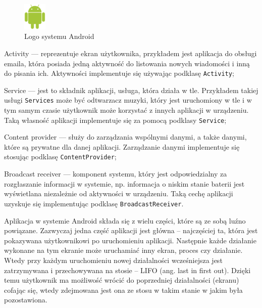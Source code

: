 \documentclass[eng,printmode,oneside]{mgr}
\begin{document}
\vspace{-2mm}
\begin{itemize}
  \item \parbox[t]{\dimexpr\textwidth-\leftmargin}{
     \vspace{-2.5mm}
    \begin{figure}
	\centering
	\includegraphics[width=0.1\textwidth]{andlogo.png}
	\caption{\label{fig:andlogo}Logo systemu Android \cite{developer.android}}
	\end{figure}
  Activity --- reprezentuje ekran użytkownika, przykładem jest aplikacja
  do obsługi emaila, która posiada jedną aktywność do listowania nowych
  wiadomości i inną do pisania ich. Aktywności implementuje się używając
  podklasę \texttt{Activity};
  \item Service --- jest to składnik aplikacji, usługa, która działa w tle.
  Przykładem takiej usługi \texttt{Services} może być odtwarzacz muzyki, który
  jest uruchomiony w tle i w tym samym czasie użytkownik może korzystać z innych aplikacji w urządzeniu.
  Taką własność aplikacji implementuje się za pomocą podklasy \texttt{Service};
	}
  \item Content provider --- służy do zarządzania wspólnymi danymi, a także
  danymi, które są prywatne dla danej aplikacji. Zarządzanie danymi
  implementuje się stosując podklasę \texttt{ContentProvider};
  \item Broadcast receiver --- komponent systemu, który jest
  odpowiedzialny za rozgłaszanie informacji w systemie, np. informacja o
  niskim stanie baterii jest wyświetlana niezależnie od aktywności w urządzeniu.
  Taką cechę aplikacji uzyskuje się implementując podklasę \texttt{BroadcastReceiver}.
\end{itemize}

Aplikacja w systemie Android składa się z wielu części, które są ze
sobą luźno powiązane. Zazwyczaj jedna część aplikacji jest główna -- najczęściej
ta, która jest pokazywana użytkownikowi po uruchomieniu aplikacji.
Następnie każde działanie wykonane na tym ekranie może uruchamiać inny ekran,
proces czy działanie. Wtedy przy każdym uruchomieniu nowej działalności
wcześniejsza jest zatrzymywana i przechowywana na stosie -- LIFO (ang. last in
first out). Dzięki temu użytkownik ma możliwość wrócić do poprzedniej
działalności (ekranu) cofając się, wtedy zdejmowana jest ona ze stosu w takim
stanie w jakim była pozostawiona.
\end{document}
